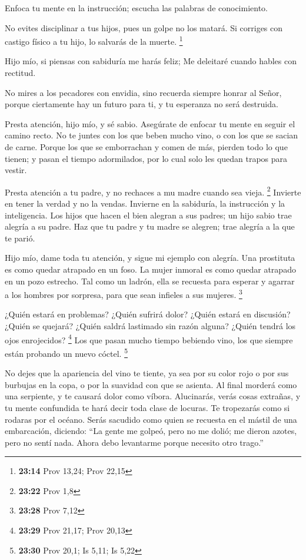  Enfoca tu mente en la instrucción; escucha las palabras de
conocimiento.

 No evites disciplinar a tus hijos, pues un golpe no los
matará.  Si corriges con castigo físico a tu hijo, lo
salvarás de la muerte. \footnote{\textbf{23:14} Prov 13,24; Prov 22,15}

 Hijo mío, si piensas con sabiduría me harás feliz;
 Me deleitaré cuando hables con rectitud.

 No mires a los pecadores con envidia, sino recuerda
siempre honrar al Señor,  porque ciertamente hay un futuro
para ti, y tu esperanza no será destruida.

 Presta atención, hijo mío, y sé sabio. Asegúrate de
enfocar tu mente en seguir el camino recto.  No te juntes
con los que beben mucho vino, o con los que se sacian de carne.
 Porque los que se emborrachan y comen de más, pierden todo
lo que tienen; y pasan el tiempo adormilados, por lo cual solo les
quedan trapos para vestir.

 Presta atención a tu padre, y no rechaces a mu madre
cuando sea vieja. \footnote{\textbf{23:22} Prov 1,8} 
Invierte en tener la verdad y no la vendas. Invierne en la sabiduría, la
instrucción y la inteligencia.  Los hijos que hacen el bien
alegran a sus padres; un hijo sabio trae alegría a su padre.
 Haz que tu padre y tu madre se alegren; trae alegría a la
que te parió.

 Hijo mío, dame toda tu atención, y sigue mi ejemplo con
alegría.  Una prostituta es como quedar atrapado en un
foso. La mujer inmoral es como quedar atrapado en un pozo estrecho.
 Tal como un ladrón, ella se recuesta para esperar y
agarrar a los hombres por sorpresa, para que sean infieles a sus
mujeres. \footnote{\textbf{23:28} Prov 7,12}

 ¿Quién estará en problemas? ¿Quién sufrirá dolor? ¿Quién
estará en discusión? ¿Quién se quejará? ¿Quién saldrá lastimado sin
razón alguna? ¿Quién tendrá los ojos enrojecidos? \footnote{\textbf{23:29}
  Prov 21,17; Prov 20,13}  Los que pasan mucho tiempo
bebiendo vino, los que siempre están probando un nuevo cóctel.
\footnote{\textbf{23:30} Prov 20,1; Is 5,11; Is 5,22}

 No dejes que la apariencia del vino te tiente, ya sea por
su color rojo o por sus burbujas en la copa, o por la suavidad con que
se asienta.  Al final morderá como una serpiente, y te
causará dolor como víbora.  Alucinarás, verás cosas
extrañas, y tu mente confundida te hará decir toda clase de locuras.
 Te tropezarás como si rodaras por el océano. Serás
sacudido como quien se recuesta en el mástil de una embarcación,
diciendo:  ``La gente me golpeó, pero no me dolió; me
dieron azotes, pero no sentí nada. Ahora debo levantarme porque necesito
otro trago.''


